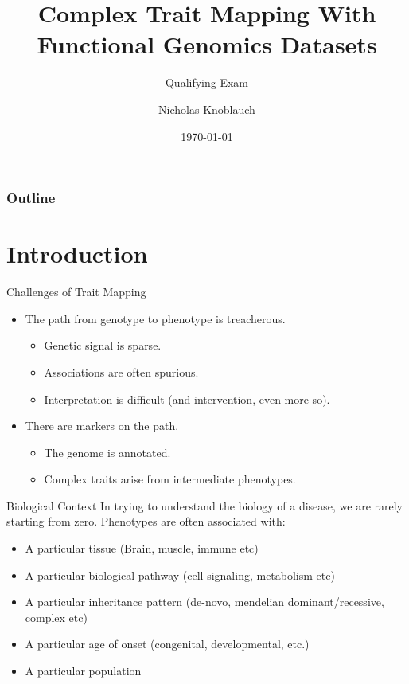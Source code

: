 \documentclass[bigger]{beamer}
\title{Complex Trait Mapping With Functional Genomics Datasets}
\subtitle{Qualifying Exam}
\author{Nicholas Knoblauch}
\date{\today}
\begin{document}
\maketitle

\begin{frame}
  \frametitle{Outline}
  \setcounter{tocdepth}{2}
  \tableofcontents
\end{frame}
 
\section{Introduction}
  
\begin{frame}{Challenges of Trait Mapping}
\begin{itemize}
\item  The path from genotype to phenotype is treacherous.
  \pause
  \begin{itemize}
  \item Genetic signal is sparse.
    \pause
  \item Associations are often spurious.
    \pause
  \item Interpretation is difficult (and intervention, even more so).
  \end{itemize}
    \pause
\item  There are markers on the path.
  \pause
  \begin{itemize}
  \item The genome is annotated.
    \pause
  \item Complex traits arise from intermediate phenotypes.
  \end{itemize}
\end{itemize}
\end{frame}

\begin{frame}{Biological Context}
  In trying to understand the biology of a disease, we are rarely starting from zero.
  Phenotypes are often associated with:
  \begin{itemize}
  \item A particular tissue (Brain, muscle, immune etc)
  \item A particular biological pathway (cell signaling, metabolism etc)
  \item A particular inheritance pattern (de-novo, mendelian dominant/recessive, complex etc)
  \item A particular age of onset (congenital, developmental, etc.)
  \item A particular population
  \end{itemize}
\end{frame}
\end{document}
